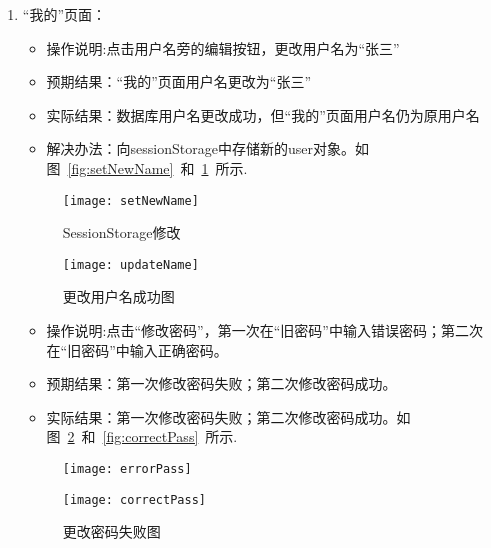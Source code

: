 \begin{enumerate}
    \item {“我的”页面}：
          \begin{itemize}
              \item{操作说明}:点击用户名旁的编辑按钮，更改用户名为“张三”
              \item {预期结果}：“我的”页面用户名更改为“张三”
              \item {实际结果}：数据库用户名更改成功，但“我的”页面用户名仍为原用户名
              \item {解决办法}：向sessionStorage中存储新的user对象。如图~\ref{fig:setNewName}~和~\ref{fig:updateName}~所示.
          \end{itemize}
          \begin{figure}[htbp]
            \centering
            \begin{minipage}{0.4\textwidth}
                \centering
                \texttt{[image: setNewName]}
                \caption{SessionStorage修改}\label{fig:setNewName}
            \end{minipage}
            \begin{minipage}{0.4\textwidth}
                \centering
                \texttt{[image: updateName]}
                \caption{更改用户名成功图}\label{fig:updateName}
            \end{minipage}
        \end{figure}
          \begin{itemize}
              \item{操作说明}:点击“修改密码”，第一次在“旧密码”中输入错误密码；第二次在“旧密码”中输入正确密码。
              \item {预期结果}：第一次修改密码失败；第二次修改密码成功。
              \item {实际结果}：第一次修改密码失败；第二次修改密码成功。如图~\ref{fig:errorPass}~和~\ref{fig:correctPass}~所示.
          \end{itemize}
          \begin{figure}[htbp]
              \centering
              \begin{minipage}{0.4\textwidth}
                  \centering
                  \texttt{[image: errorPass]}
                  \caption{更改密码失败图}\label{fig:errorPass}
              \end{minipage}
              \begin{minipage}{0.4\textwidth}
                  \centering
                  \texttt{[image: correctPass]}

\end{minipage}
\end{figure}
\end{enumerate}
